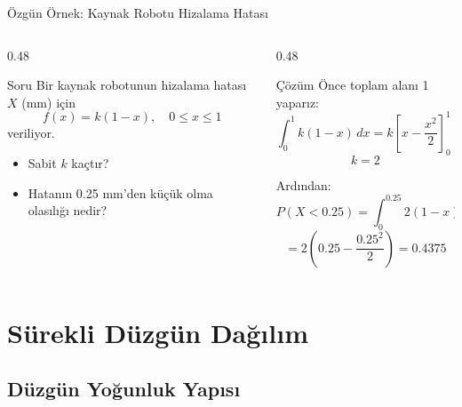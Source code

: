 \documentclass[light]{lutbeamer}
\begin{document}
\begin{frame}{Özgün Örnek: Kaynak Robotu Hizalama Hatası}
\small
\begin{columns}[T,onlytextwidth]
    \begin{column}{0.48\textwidth}
        \begin{block}{Soru}
            Bir kaynak robotunun hizalama hatası $X$ (mm) için
            \[
            f(x)=k(1-x), \quad 0 \le x \le 1
            \]
            veriliyor.

            \vspace{0.15cm}
            \begin{itemize}
                \item Sabit $k$ kaçtır?
                \item Hatanın 0.25 mm'den küçük olma olasılığı nedir?
            \end{itemize}
        \end{block}
    \end{column}
    \begin{column}{0.48\textwidth}
        \begin{exampleblock}{Çözüm}
            Önce toplam alanı 1 yaparız:
            \[
            \int_0^1 k(1-x)\,dx = k\left[x-\frac{x^2}{2}\right]_0^1 = \frac{k}{2}=1
            \]
            \[
            k=2
            \]

            \vspace{0.15cm}
            Ardından:
            \[
            P(X<0.25)=\int_0^{0.25} 2(1-x)\,dx
            \]
            \[
            = 2\left(0.25-\frac{0.25^2}{2}\right)=0.4375
            \]
        \end{exampleblock}
    \end{column}
\end{columns}
\end{frame}

\section{Sürekli Düzgün Dağılım}
\subsection{Düzgün Yoğunluk Yapısı}
\end{document}

